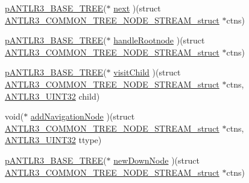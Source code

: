 \begin{DoxyCompactItemize}
\item 
\hyperlink{antlr3interfaces_8h_a6313a8a3e8f044398a393bd10c083852}{p\-A\-N\-T\-L\-R3\-\_\-\-B\-A\-S\-E\-\_\-\-T\-R\-E\-E}($\ast$ \hyperlink{struct_a_n_t_l_r3___c_o_m_m_o_n___t_r_e_e___n_o_d_e___s_t_r_e_a_m__struct_a4e17c2be771dd3c3f1a35f9e234cac39}{next} )(struct \hyperlink{struct_a_n_t_l_r3___c_o_m_m_o_n___t_r_e_e___n_o_d_e___s_t_r_e_a_m__struct}{A\-N\-T\-L\-R3\-\_\-\-C\-O\-M\-M\-O\-N\-\_\-\-T\-R\-E\-E\-\_\-\-N\-O\-D\-E\-\_\-\-S\-T\-R\-E\-A\-M\-\_\-struct} $\ast$ctns)
\item 
\hyperlink{antlr3interfaces_8h_a6313a8a3e8f044398a393bd10c083852}{p\-A\-N\-T\-L\-R3\-\_\-\-B\-A\-S\-E\-\_\-\-T\-R\-E\-E}($\ast$ \hyperlink{struct_a_n_t_l_r3___c_o_m_m_o_n___t_r_e_e___n_o_d_e___s_t_r_e_a_m__struct_aa11f28f4802d746339d097448ac2d0ff}{handle\-Rootnode} )(struct \hyperlink{struct_a_n_t_l_r3___c_o_m_m_o_n___t_r_e_e___n_o_d_e___s_t_r_e_a_m__struct}{A\-N\-T\-L\-R3\-\_\-\-C\-O\-M\-M\-O\-N\-\_\-\-T\-R\-E\-E\-\_\-\-N\-O\-D\-E\-\_\-\-S\-T\-R\-E\-A\-M\-\_\-struct} $\ast$ctns)
\item 
\hyperlink{antlr3interfaces_8h_a6313a8a3e8f044398a393bd10c083852}{p\-A\-N\-T\-L\-R3\-\_\-\-B\-A\-S\-E\-\_\-\-T\-R\-E\-E}($\ast$ \hyperlink{struct_a_n_t_l_r3___c_o_m_m_o_n___t_r_e_e___n_o_d_e___s_t_r_e_a_m__struct_aa6b60126c9d7efd19bac47912b439851}{visit\-Child} )(struct \hyperlink{struct_a_n_t_l_r3___c_o_m_m_o_n___t_r_e_e___n_o_d_e___s_t_r_e_a_m__struct}{A\-N\-T\-L\-R3\-\_\-\-C\-O\-M\-M\-O\-N\-\_\-\-T\-R\-E\-E\-\_\-\-N\-O\-D\-E\-\_\-\-S\-T\-R\-E\-A\-M\-\_\-struct} $\ast$ctns, \hyperlink{antlr3defs_8h_ac41f744abd0fd25144b9eb9d11b1dfd1}{A\-N\-T\-L\-R3\-\_\-\-U\-I\-N\-T32} child)
\item 
void($\ast$ \hyperlink{struct_a_n_t_l_r3___c_o_m_m_o_n___t_r_e_e___n_o_d_e___s_t_r_e_a_m__struct_adb6c3665dd6cf02554fa6cae1aeba265}{add\-Navigation\-Node} )(struct \hyperlink{struct_a_n_t_l_r3___c_o_m_m_o_n___t_r_e_e___n_o_d_e___s_t_r_e_a_m__struct}{A\-N\-T\-L\-R3\-\_\-\-C\-O\-M\-M\-O\-N\-\_\-\-T\-R\-E\-E\-\_\-\-N\-O\-D\-E\-\_\-\-S\-T\-R\-E\-A\-M\-\_\-struct} $\ast$ctns, \hyperlink{antlr3defs_8h_ac41f744abd0fd25144b9eb9d11b1dfd1}{A\-N\-T\-L\-R3\-\_\-\-U\-I\-N\-T32} ttype)
\item 
\hyperlink{antlr3interfaces_8h_a6313a8a3e8f044398a393bd10c083852}{p\-A\-N\-T\-L\-R3\-\_\-\-B\-A\-S\-E\-\_\-\-T\-R\-E\-E}($\ast$ \hyperlink{struct_a_n_t_l_r3___c_o_m_m_o_n___t_r_e_e___n_o_d_e___s_t_r_e_a_m__struct_a36207dc3cd931dabf5865c7a8891fa61}{new\-Down\-Node} )(struct \hyperlink{struct_a_n_t_l_r3___c_o_m_m_o_n___t_r_e_e___n_o_d_e___s_t_r_e_a_m__struct}{A\-N\-T\-L\-R3\-\_\-\-C\-O\-M\-M\-O\-N\-\_\-\-T\-R\-E\-E\-\_\-\-N\-O\-D\-E\-\_\-\-S\-T\-R\-E\-A\-M\-\_\-struct} $\ast$ctns)

\end{DoxyCompactItemize}
